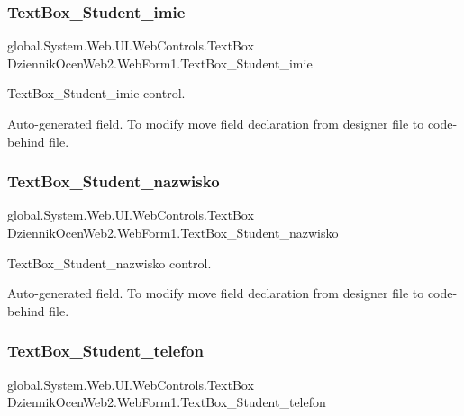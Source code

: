 \subsubsection{\texorpdfstring{Text\+Box\+\_\+\+Student\+\_\+imie}{TextBox\_Student\_imie}}
{\footnotesize\ttfamily global.\+System.\+Web.\+U\+I.\+Web\+Controls.\+Text\+Box Dziennik\+Ocen\+Web2.\+Web\+Form1.\+Text\+Box\+\_\+\+Student\+\_\+imie\hspace{0.3cm}{\ttfamily [protected]}}



Text\+Box\+\_\+\+Student\+\_\+imie control. 

Auto-\/generated field. To modify move field declaration from designer file to code-\/behind file. \mbox{\label{class_dziennik_ocen_web2_1_1_web_form1_a161c5620ac7416db86706166470fd9f4}} 
\subsubsection{\texorpdfstring{Text\+Box\+\_\+\+Student\+\_\+nazwisko}{TextBox\_Student\_nazwisko}}
{\footnotesize\ttfamily global.\+System.\+Web.\+U\+I.\+Web\+Controls.\+Text\+Box Dziennik\+Ocen\+Web2.\+Web\+Form1.\+Text\+Box\+\_\+\+Student\+\_\+nazwisko\hspace{0.3cm}{\ttfamily [protected]}}



Text\+Box\+\_\+\+Student\+\_\+nazwisko control. 

Auto-\/generated field. To modify move field declaration from designer file to code-\/behind file. \mbox{\label{class_dziennik_ocen_web2_1_1_web_form1_a21c07d34e93b30186e57f2a7e6786389}} 
\subsubsection{\texorpdfstring{Text\+Box\+\_\+\+Student\+\_\+telefon}{TextBox\_Student\_telefon}}
{\footnotesize\ttfamily global.\+System.\+Web.\+U\+I.\+Web\+Controls.\+Text\+Box Dziennik\+Ocen\+Web2.\+Web\+Form1.\+Text\+Box\+\_\+\+Student\+\_\+telefon\hspace{0.3cm}{\ttfamily [protected]}}




